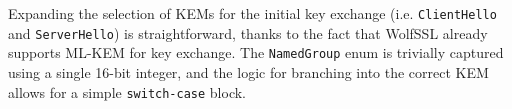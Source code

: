 \documentclass[letterpaper,12pt,titlepage,oneside,final]{book}
\begin{document}



Expanding the selection of KEMs for the initial key exchange (i.e. \texttt{ClientHello} and \texttt{ServerHello}) is straightforward, thanks to the fact that WolfSSL already supports ML-KEM for key exchange. The \texttt{NamedGroup} enum is trivially captured using a single 16-bit integer, and the logic for branching into the correct KEM allows for a simple \texttt{switch-case} block.


\end{document}
